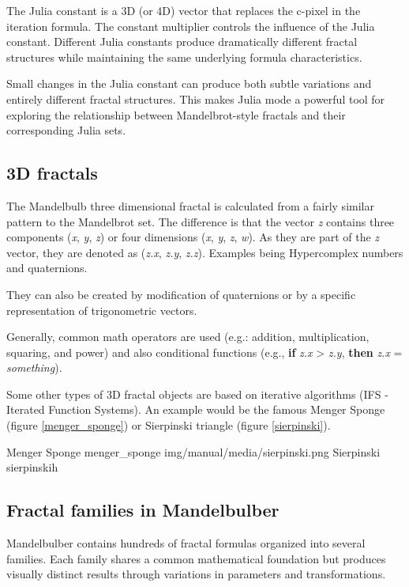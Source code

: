 The Julia constant is a 3D (or 4D) vector that replaces the c-pixel in the iteration formula. The constant multiplier controls the influence of the Julia constant. Different Julia constants produce dramatically different fractal structures while maintaining the same underlying formula characteristics.

Small changes in the Julia constant can produce both subtle variations and entirely different fractal structures. This makes Julia mode a powerful tool for exploring the relationship between Mandelbrot-style fractals and their corresponding Julia sets.

\subsection{3D fractals}\label{d-fractals}

The Mandelbulb three dimensional fractal is calculated from a
fairly similar pattern to the Mandelbrot set. The difference is that the vector
\emph{z} contains three components (\emph{x}, \emph{y}, \emph{z}) or four
dimensions (\emph{x}, \emph{y}, \emph{z}, \emph{w}). As they are part of the
\emph{z} vector, they are denoted as (\emph{z.x}, \emph{z.y}, \emph{z.z}).
Examples being Hypercomplex numbers and quaternions.

They can also be created by modification of quaternions or by a specific
representation of trigonometric vectors. 

Generally, common math operators are
used (e.g.: addition, multiplication, squaring, and power) and also
conditional functions (e.g., \textbf{if} \emph{z.x} \textgreater{} \emph{z.y},
\textbf{then} \emph{z.x} = \emph{something}).

Some other types of 3D fractal objects are based on iterative algorithms (IFS -
Iterated Function Systems). An example would be the famous Menger Sponge (figure \ref{menger_sponge}) or Sierpinski triangle (figure \ref{sierpinski}).
\nopagebreak

{Menger Sponge}
{menger_sponge}
{img/manual/media/sierpinski.png}
{Sierpinski}
{sierpinski}{h}

\subsection{Fractal families in Mandelbulber}\label{fractal-families}

Mandelbulber contains hundreds of fractal formulas organized into several families. Each family shares a common mathematical foundation but produces visually distinct results through variations in parameters and transformations.

